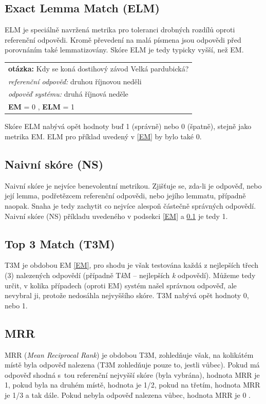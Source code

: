\subsection{Exact Lemma Match (ELM)}
\label{ELM}
ELM je speciálně navržená metrika pro toleranci drobných rozdílů oproti referenční odpovědi. Kromě převedení na malá písmena jsou odpovědi před porovnáním také lemmatizovány. Skóre ELM je tedy typicky vyšší, než EM.
\begin{center}
\begin{tabular}{l}
    \textbf{otázka:} Kdy se koná dostihový závod Velká pardubická?\\
    \emph{referenční odpověď:} druhou říjnovou neděli\\
    \emph{odpověď systému:} druhá říjnová neděle \\
    \textbf{EM} = 0 , \textbf{ELM} = 1\\
\end{tabular}
\end{center}

Skóre ELM nabývá opět hodnoty buď 1 (správně) nebo 0 (špatně), stejně jako metrika EM. ELM pro příklad uvedený v \ref{EM} by bylo také 0.

\subsection{Naivní skóre (NS)}
Naivní skóre je nejvíce benevolentní metrikou. Zjišťuje se, zda-li je odpověď, nebo její lemma, podřetězcem referenční odpovědi, nebo jejího lemmatu, případně naopak. Snaha je tedy zachytit co nejvíce alespoň částečně správných odpovědí. Naivní skóre (NS) příkladu uvedeného v podsekci \ref{EM} a \ref{ELM} je tedy 1. 

\subsection{Top 3 Match (T3M)}
T3M je obdobou EM \ref{EM}, pro shodu je však testována každá z nejlepších třech (3) nalezených odpovědí (případně T\textit{k}M -- nejlepších \textit{k} odpovědí). Můžeme tedy určit, v kolika případech (oproti EM) systém našel správnou odpověď, ale nevybral ji, protože nedosáhla nejvyššího skóre. T3M nabývá opět hodnoty 0, nebo 1.

\subsection{MRR}
MRR (\emph{Mean Reciprocal Rank}) je obdobou T3M, zohledňuje však, na kolikátém místě byla odpověď nalezena (T3M zohledňuje pouze to, jestli vůbec). Pokud má odpověď shodná s~tou referenční nejvyšší skóre (byla vybrána), hodnota MRR je 1, pokud byla na druhém místě, hodnota je 1/2, pokud na třetím, hodnota MRR je 1/3 a tak dále. Pokud nebyla odpověď nalezena vůbec, hodnota MRR je 0 \cite{MRR}.

